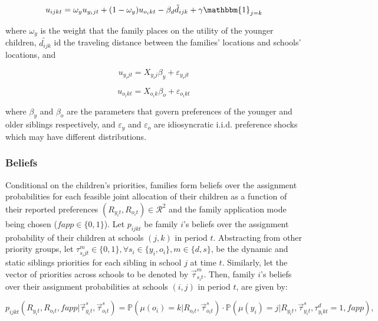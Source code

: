 \documentclass{article}
\begin{document}
\begin{equation}
    u_{ijkt} = \omega_{y} u_{y_ijt} + (1-\omega_{y})u_{o_ikt} - \beta_d \tilde{d}_{ijk} + \gamma \mathbbm{1}_{j = k}
\end{equation}

where $\omega_{y}$ is the weight that the family places on the utility of the younger children, $\tilde{d_{ijk}}$ id the traveling distance between the families' locations and schools' locations, and 

\begin{equation}
    u_{y_ijt} = X_{y_ij}\beta_y + \varepsilon_{y_ijt}
\end{equation}

\begin{equation}
    u_{o_ikt} = X_{o_ik}\beta_o + \varepsilon_{o_ikt}
\end{equation}

where $\beta_y$ and $\beta_o$ are the parameters that govern preferences of the younger and older siblings respectively, and $\varepsilon_{y}$ and $\varepsilon_{o}$ are idiosyncratic i.i.d. preference shocks which may have different distributions.


\subsubsection{Beliefs}

Conditional on the children's priorities, families form beliefs over the assignment probabilities for each feasible joint allocation of their children as a function of their reported preferences $\left(R_{y_i t}, R_{o_i t} \right)\in \mathcal{R}^2$ and the family application mode being chosen ($fapp \in \lbrace 0, 1 \rbrace$). Let $p_{ijkt}$ be family $i$'s beliefs over the assignment probability of their children at schools $(j,k)$ in period $t$. Abstracting from other priority groups, let $\tau^m_{s_ijt} \in \lbrace 0, 1 \rbrace, \forall s_i\in \lbrace y_i, o_i\rbrace, m \in \lbrace d, s \rbrace $, be the dynamic and static siblings priorities for each sibling in school $j$ at time $t$. Similarly, let the vector of priorities across schools to be denoted by $\vec{\tau}^m_{s_it}$. Then, family $i$'s beliefs over their assignment probabilities at schools $(i,j)$ in period $t$, are given by:

\begin{equation}\label{eq:prob_joint_assignment}
    p_{ijkt}\left( R_{y_i t}, R_{o_i t}, fapp| \vec{\tau}^{s}_{y_it}, \vec{\tau}^{s}_{o_it} \right) = \mathbb{P} \left( \mu(o_i) = k | R_{o_i t}, \vec{\tau}^{s}_{o_it} \right)\cdot \mathbb{P} \left( \mu(y_i) = j | R_{y_i t}, \vec{\tau}^{s}_{y_it}, \tau^{d}_{y_ikt} = 1, fapp  \right),
\end{equation}
\end{document}
